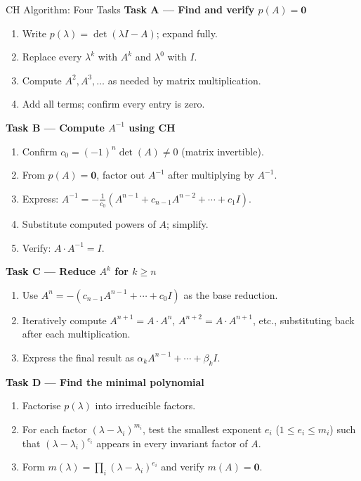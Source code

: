 \documentclass[12pt,a4paper]{article}
\begin{document}
\begin{learnbox}{CH Algorithm: Four Tasks}
\textbf{Task A --- Find and verify $p(A)=\mathbf{0}$}
\begin{enumerate}
  \item Write $p(\lambda) = \det(\lambda I - A)$; expand fully.
  \item Replace every $\lambda^{k}$ with $A^{k}$ and $\lambda^{0}$ with $I$.
  \item Compute $A^{2}, A^{3},\ldots$ as needed by matrix multiplication.
  \item Add all terms; confirm every entry is zero.
\end{enumerate}

\textbf{Task B --- Compute $A^{-1}$ using CH}
\begin{enumerate}
  \item Confirm $c_{0} = (-1)^{n}\det(A) \neq 0$ (matrix invertible).
  \item From $p(A)=\mathbf{0}$, factor out $A^{-1}$ after multiplying by $A^{-1}$.
  \item Express: $A^{-1} = -\tfrac{1}{c_0}(A^{n-1}+c_{n-1}A^{n-2}+\cdots+c_1 I)$.
  \item Substitute computed powers of $A$; simplify.
  \item Verify: $A \cdot A^{-1} = I$.
\end{enumerate}

\textbf{Task C --- Reduce $A^{k}$ for $k \geq n$}
\begin{enumerate}
  \item Use $A^{n} = -(c_{n-1}A^{n-1}+\cdots+c_0 I)$ as the base reduction.
  \item Iteratively compute $A^{n+1}=A\cdot A^{n}$, $A^{n+2}=A\cdot A^{n+1}$, etc.,
        substituting back after each multiplication.
  \item Express the final result as $\alpha_{k}A^{n-1}+\cdots+\beta_{k}I$.
\end{enumerate}

\textbf{Task D --- Find the minimal polynomial}
\begin{enumerate}
  \item Factorise $p(\lambda)$ into irreducible factors.
  \item For each factor $(\lambda-\lambda_i)^{m_i}$, test the smallest exponent $e_i$ ($1\leq e_i\leq m_i$)
        such that $(\lambda-\lambda_i)^{e_i}$ appears in every invariant factor of $A$.
  \item Form $m(\lambda) = \prod_{i}(\lambda-\lambda_i)^{e_i}$ and verify $m(A)=\mathbf{0}$.
\end{enumerate}
\end{learnbox}
\end{document}
